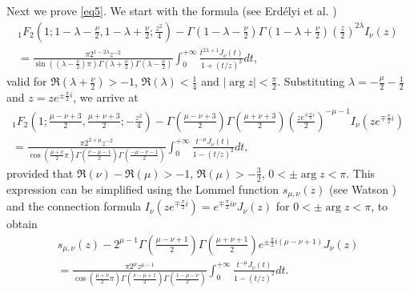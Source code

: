 \documentclass[a4paper,twoside,10pt]{amsart}
\numberwithin{equation}{section}
\begin{document}
Next we prove \eqref{eq5}. We start with the formula (see Erd\'elyi et al. \cite[p. 225, entry (13)]{Erdelyi2})
\begin{multline*}
{}_1F_2 \left( {1;1 - \lambda  - \frac{\nu }{2},1 - \lambda  + \frac{\nu }{2};\frac{z^2}{4}} \right) - \Gamma \left( {1 - \lambda  - \frac{\nu }{2}} \right)\Gamma \left( {1 - \lambda  + \frac{\nu }{2}} \right)\left( {\frac{z}{2}} \right)^{2\lambda } I_\nu  \left( z \right) \\ = \frac{{\pi 2^{1 - 2\lambda }  z^{ - 2} }}{{\sin \left( {\left( {\lambda  - \frac{\nu }{2}} \right)\pi } \right)\Gamma \left( {\lambda  + \frac{\nu }{2}} \right)\Gamma \left( {\lambda  - \frac{\nu }{2}} \right)}}\int_0^{ + \infty } {\frac{{t^{2\lambda  + 1} J_\nu  \left( t \right)}}{{1 + \left( {t/z} \right)^2 }}dt} ,
\end{multline*}
valid for $\Re \left( {\lambda  + \frac{\nu }{2}} \right) >  - 1$, $\Re \left( \lambda  \right) < \frac{1}{4}$ and $\left|\arg z\right| <\frac{\pi}{2}$. Substituting $\lambda  =  - \frac{\mu }{2} - \frac{1}{2}$ and $z = ze^{ \pm \frac{\pi }{2}i}$, we arrive at
\begin{multline*}
{}_1F_2 \left( {1;\frac{{\mu  - \nu  + 3}}{2},\frac{{\mu  + \nu  + 3}}{2}; - \frac{z^2}{4}} \right) - \Gamma \left( {\frac{{\mu  - \nu  + 3}}{2}} \right)\Gamma \left( {\frac{{\mu  + \nu  + 3}}{2}} \right)\left( {\frac{{ze^{ \mp \frac{\pi }{2}i} }}{2}} \right)^{ - \mu  - 1} I_\nu  \left( {ze^{ \mp \frac{\pi }{2}i} } \right) \\ =  \frac{{\pi 2^{2 + \mu } z^{ - 2} }}{{\cos \left( {\frac{{\mu  + \nu }}{2}\pi } \right)\Gamma \left( {\frac{{\nu  - \mu  - 1}}{2}} \right)\Gamma \left( {\frac{{ - \mu  - \nu  - 1}}{2}} \right)}}\int_0^{ + \infty } {\frac{{t^{ - \mu } J_\nu  \left( t \right)}}{{1 - \left( {t/z} \right)^2 }}dt} ,
\end{multline*}
provided that $\Re \left( \nu  \right) - \Re \left( \mu  \right) >  - 1$, $\Re \left( \mu  \right) >  - \frac{3}{2}$, $0 <  \pm \arg z < \pi$. This expression can be simplified using the Lommel function $s_{\mu ,\nu } \left( z \right)$ (see Watson \cite[p. 346, expression (10)]{Watson}) and the connection formula $I_\nu  \left( {ze^{ \mp \frac{\pi }{2}i} } \right) = e^{ \mp \frac{\pi}{2} i \nu } J_\nu  \left( z \right)$ for $0 <  \pm \arg z < \pi$, to obtain
\begin{multline*}
s_{\mu ,\nu } \left( z \right) - 2^{\mu  - 1} \Gamma \left( {\frac{{\mu  - \nu  + 1}}{2}} \right)\Gamma \left( {\frac{{\mu  + \nu  + 1}}{2}} \right)e^{ \pm \frac{\pi }{2}i\left( {\mu  - \nu  + 1} \right)} J_\nu  \left( z \right)
\\ = \frac{{\pi 2^\mu  z^{\mu  - 1} }}{{\cos \left( {\frac{{\mu  + \nu }}{2}\pi } \right)\Gamma \left( {\frac{{\nu  - \mu  + 1}}{2}} \right)\Gamma \left( {\frac{{1 - \mu  - \nu }}{2}} \right)}}\int_0^{ + \infty } {\frac{{t^{ - \mu } J_\nu  \left( t \right)}}{{1 - \left( {t/z} \right)^2 }}dt} .
\end{multline*}
\end{document}
